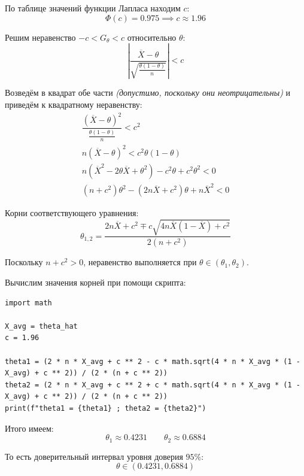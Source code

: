 По таблице значений функции Лапласа находим \( c \):
\[
\Phi(c) = 0.975 \implies c \approx 1.96
\]

Решим неравенство \( -c<G_\theta<c \) относительно \( \theta \):
\[
    \left|\dfrac{\overline{X} - \theta}{\sqrt{\frac{\theta(1-\theta)}{n}}}\right|<c
\]

Возведём в квадрат обе части \textit{(допустимо, поскольку они неотрицательны)} и приведём к квадратному неравенству:
\[
\begin{gathered}
    \dfrac{(\overline{X} - \theta)^2}{\frac{\theta(1-\theta)}{n}}<c^2\\
    n(\overline{X}-\theta)^2<c^2\theta(1-\theta)\\
    n(\overline{X}^2-2\theta\overline{X}+\theta^2)-c^2\theta+c^2\theta^2<0\\
    (n + c^2)\theta^2 - (2n\overline{X} + c^2)\theta + n\overline{X}^2 < 0
\end{gathered}
\]

Корни соответствующего уравнения:
\[
    \theta_{1,2} = \frac{2n\overline{X} + c^2 \mp c\sqrt{4n\overline{X}(1-\overline{X}) + c^2}}{2(n + c^2)}
\]

Поскольку \( n+c^2>0 \), неравенство выполняется при \( \theta\in(\theta_1,\theta_2) \).

Вычислим значения корней при помощи скрипта:

\begin{lstlisting}[caption=Расчёт границ доверительного интервала]
import math

X_avg = theta_hat
c = 1.96

theta1 = (2 * n * X_avg + c ** 2 - c * math.sqrt(4 * n * X_avg * (1 - X_avg) + c ** 2)) / (2 * (n + c ** 2))
theta2 = (2 * n * X_avg + c ** 2 + c * math.sqrt(4 * n * X_avg * (1 - X_avg) + c ** 2)) / (2 * (n + c ** 2))
print(f"theta1 = {theta1} ; theta2 = {theta2}")
\end{lstlisting}

Итого имеем:
\[
    \theta_1\approx 0.4231\qquad\theta_2\approx0.6884
\]

То есть доверительный интервал уровня доверия \( 95\% \):
\[
    \theta\in(0.4231,0.6884)
\]
